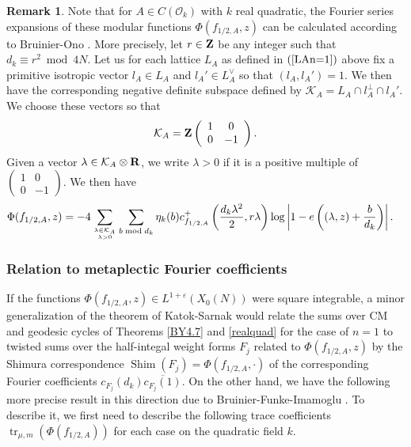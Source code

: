 \documentclass{amsart}
\theoremstyle{definition}
\theoremstyle{definition}
\theoremstyle{definition}
\newtheorem{remark}[theorem]{Remark}
\begin{document}
\begin{remark} Note that for $A \in C(\mathcal{O}_k)$ with $k$ real quadratic, the Fourier series expansions of these modular functions $\Phi(f_{1/2, A}, z)$ 
can be calculated according to Bruinier-Ono \cite[Theorem 5.3, cf.~(5.10)]{BO}. More precisely, let $r \in {\bf{Z}}$ be any integer such that $d_k \equiv r^2 \bmod 4N$.
Let us for each lattice $L_A$ as defined in $(\ref{LAn=1})$ above fix a primitive isotropic vector $l_A \in L_A$ and $l_A' \in L_A^{\vee}$
so that $(l_A, l_A')=1$. We then have the corresponding negative definite subspace defined by $\mathcal{K}_A = L_A \cap l_A^{\perp} \cap l_A'$. 
We choose these vectors so that \begin{align*} \mathcal{K}_A = {\bf{Z}} \left(  \begin{array}{cc} 1 & 0 \\ 0 & - 1 \end{array}\right).\end{align*}
Given a vector $\lambda \in \mathcal{K}_A \otimes {\bf{R}}$, we write $\lambda >0$ if it is a positive multiple of 
$\left(\begin{array}{cc} 1 & 0 \\ 0 & -1\end{array} \right)$. We then have 
\begin{align*}\Phi(f_{1/2, A}, z) &= -4 \sum\limits_{ \lambda \in \mathcal{K}_A \atop \lambda >0 } \sum\limits_{b \bmod d_k} \eta_k(b) 
c_{f_{1/2, A}}^+ \left( \frac{ d_k  \lambda^2}{2}, r \lambda \right) \log \left\vert 1 - e \left( (\lambda, z) + \frac{b}{d_k} \right) \right\vert. \end{align*}

\end{remark}

\subsubsection{Relation to metaplectic Fourier coefficients}

If the functions $\Phi(f_{1/2, A}, z) \in L^{1+\varepsilon}(X_0(N))$ were square integrable, a minor generalization of the theorem of 
Katok-Sarnak \cite{KaSa} would relate the sums over CM and geodesic cycles of Theorems \ref{BY4.7} and \ref{realquad} for the case of $n=1$ to twisted sums over the half-integal weight 
forms $F_j$ related to $\Phi(f_{1/2, A}, z)$ by the Shimura correspondence $\operatorname{Shim}(F_j) = \Phi( f_{1/2, A}, \cdot)$ of the corresponding 
Fourier coefficients $c_{F_j}(d_k) \overline{c_{F_j}(1)}$. On the other hand, we have the following more precise result in this direction due to 
Bruinier-Funke-Imamoglu \cite{BFI}. To describe it, we first need to describe the following trace coefficients $\operatorname{tr}_{\mu, m}(\Phi(f_{1/2, A}))$ for each case on the quadratic field $k$.
\end{document}
